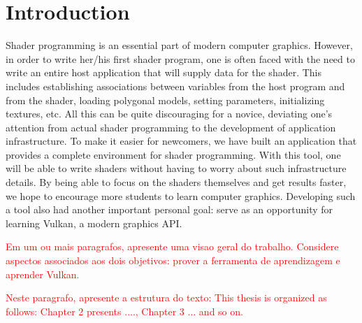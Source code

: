 \chapter{Introduction}

Shader programming is an essential part of modern computer graphics. However, in order to write her/his first shader program, one is often faced with the need to write an entire host application that will supply data for the shader. This includes establishing associations between variables from the host program and from the shader, loading polygonal models, setting parameters, initializing textures, etc.  
All this can be quite discouraging for a novice, deviating one's attention from actual shader programming to the development of application infrastructure.
%
%
%
To make it easier for newcomers, we have built an application that provides a complete environment for shader programming. With this tool, one will be able to write shaders without having to worry about such infrastructure details. By being able to focus on the shaders themselves and get results faster, we hope to encourage more students to learn computer graphics.
Developing such a tool also had another important personal goal: serve as an opportunity for learning Vulkan, a modern graphics API.

\textcolor{red}{Em um ou mais paragrafos, apresente uma visao geral do trabalho. Considere aspectos associados aos dois objetivos: prover a ferramenta de aprendizagem e aprender Vulkan.}

\textcolor{red}{Neste paragrafo, apresente a estrutura do texto: This thesis is organized as follows: Chapter 2 presents ...., Chapter 3 ... and so on.}


